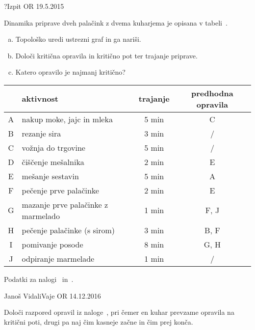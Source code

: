 \begin{naloga}{?}{Izpit OR 19.5.2015}
\begin{vprasanje}[palacinke]
Dinamika priprave dveh palačink z dvema kuharjema
je opisana v tabeli~\tab{}.
\begin{enumerate}[(a)]
\item Topološko uredi ustrezni graf in ga nariši.
\item Določi kritična opravila in kritično pot ter trajanje priprave.
\item Katero opravilo je najmanj kritično?
\end{enumerate}

\begin{tabela}
\begin{tabular}{c|l|c|c}
& aktivnost & trajanje & predhodna opravila \\
\hline
A & nakup moke, jajc in mleka & 5 min & C \\
B & rezanje sira & 3 min & / \\
C & vožnja do trgovine & 5 min & / \\
D & čiščenje mešalnika & 2 min & E \\
E & mešanje sestavin & 5 min & A \\
F & pečenje prve palačinke & 2 min & E \\
G & mazanje prve palačinke z marmelado & 1 min & F, J \\
H & pečenje palačinke (s sirom) & 3 min & B, F \\
I & pomivanje posode & 8 min & G, H \\
J & odpiranje marmelade & 1 min & / \\
\end{tabular}
\caption{Podatki za nalogi~\nal{} in~.}
\end{tabela}
\end{vprasanje}
\begin{odgovor}
\end{odgovor}
\end{naloga}


\begin{naloga}{Janoš Vidali}{Vaje OR 14.12.2016}
\begin{vprasanje}[palacinke2]
Določi razpored opravil iz naloge~,
pri čemer en kuhar prevzame opravila na kritični poti,
drugi pa naj čim kasneje začne in čim prej konča.
\end{vprasanje}
\begin{odgovor}
\end{odgovor}
\end{naloga}


